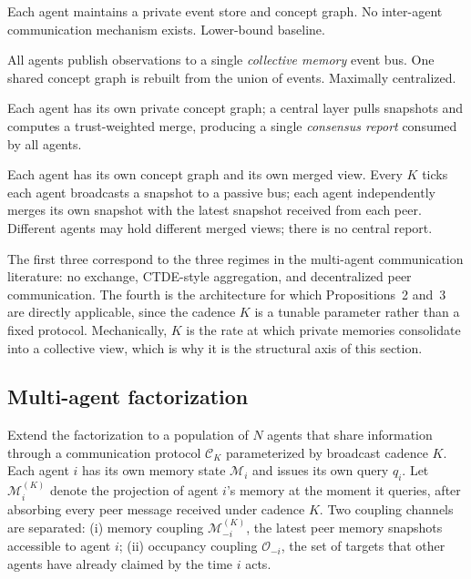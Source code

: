 \documentclass{article}
\begin{document}
\begin{description}[leftmargin=10pt,topsep=2pt,itemsep=2pt]
\item[Independent.] Each agent maintains a private event store and concept graph. No inter-agent communication mechanism exists. Lower-bound baseline.
\item[Shared bus.] All agents publish observations to a single \emph{collective memory} event bus. One shared concept graph is rebuilt from the union of events. Maximally centralized.
\item[Central aggregator (ConsensusLayer).] Each agent has its own private concept graph; a central layer pulls snapshots and computes a trust-weighted merge, producing a single \emph{consensus report} consumed by all agents.
\item[Peer-to-peer broadcast (cadence $K$).] Each agent has its own concept graph and its own merged view. Every $K$ ticks each agent broadcasts a snapshot to a passive bus; each agent independently merges its own snapshot with the latest snapshot received from each peer. Different agents may hold different merged views; there is no central report.
\end{description}

The first three correspond to the three regimes in the multi-agent
communication literature: no exchange, CTDE-style aggregation, and
decentralized peer communication. The fourth is the architecture for
which Propositions~2 and~3 are directly
applicable, since the cadence $K$ is a tunable parameter rather than a
fixed protocol. Mechanically, $K$ is the rate at which private
memories consolidate into a collective view, which is why it is the
structural axis of this section.

\subsection{Multi-agent factorization}
\label{sec:multi-theory}

Extend the factorization to a population of $N$ agents that share
information through a communication protocol $\mathcal{C}_K$
parameterized by broadcast cadence $K$. Each agent $i$ has its own
memory state $\mathcal{M}_i$ and issues its own query $q_i$. Let
$\mathcal{M}_i^{(K)}$ denote the projection of agent $i$'s memory at
the moment it queries, after absorbing every peer message received
under cadence $K$. Two coupling channels are separated: (i) memory
coupling $\mathcal{M}_{-i}^{(K)}$, the latest peer memory snapshots
accessible to agent $i$; (ii) occupancy coupling $\mathcal{O}_{-i}$,
the set of targets that other agents have already claimed by the time
$i$ acts.
\end{document}
